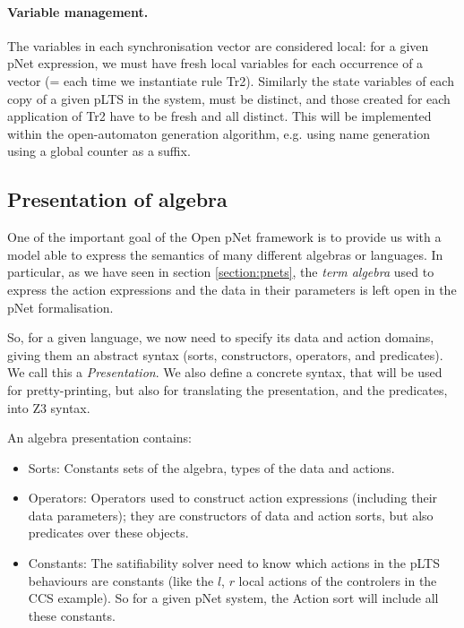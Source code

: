 \documentclass{lncs/llncs}
\begin{document}
    


\paragraph{Variable management.}
The variables in each synchronisation vector are considered local:
for a given pNet expression, we must have fresh local variables for
each occurrence of a vector (= each time we instantiate rule
Tr2). Similarly the state variables of each copy of a
given pLTS in the system, must be distinct, and those created for each
application of Tr2 have to be fresh and all distinct. 
This will be implemented within the open-automaton generation algorithm,
e.g. using name generation using a global counter as a suffix.


\subsection{Presentation of algebra}
One of the important goal of the Open pNet framework is to provide us
with a model able to express the semantics of many different algebras
or languages. In particular, as we have seen in section
\ref{section:pnets}, the \emph{term algebra} used to express the
action expressions and the data in their parameters is left open in
the pNet formalisation.

So, for a given language, we now need to specify its data and action
domains, giving them an abstract syntax (sorts, constructors, operators,
and predicates). We call this a \emph{Presentation}.
We also define a concrete syntax, that will be used for
pretty-printing, but also for translating the presentation, and the
predicates, into Z3 syntax. 

An algebra presentation contains:
\begin{itemize}
	\item Sorts: Constants sets of the algebra, types of the data
          and actions. 
	\item Operators: Operators used to construct action
          expressions (including their data parameters); they are
          constructors of data and action sorts, but also predicates
          over these objects.
        \item Constants: The satifiability solver need to know which
          actions in the pLTS behaviours are constants (like the $l$,
          $r$ local actions of the controlers in the CCS example). So
          for a given pNet system, the Action sort will include all
          these constants.
\end{itemize}
\end{document}
